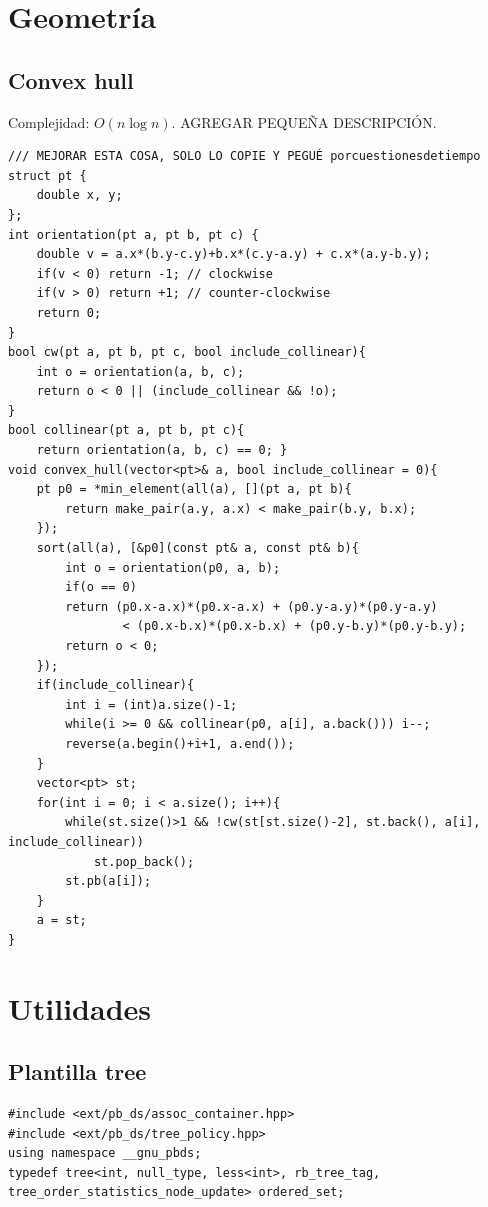 \documentclass[12 pts,spanish,mexico]{article}
\numberwithin{equation}{section}
\begin{document}
\begin{multicols}{2}
\section{Geometría}
\subsection{Convex hull}
Complejidad: $O(n\log n)$. AGREGAR PEQUEÑA DESCRIPCIÓN.
\begin{verbatim}
/// MEJORAR ESTA COSA, SOLO LO COPIE Y PEGUÉ porcuestionesdetiempo
struct pt {
    double x, y;
};
int orientation(pt a, pt b, pt c) {
    double v = a.x*(b.y-c.y)+b.x*(c.y-a.y) + c.x*(a.y-b.y);
    if(v < 0) return -1; // clockwise
    if(v > 0) return +1; // counter-clockwise
    return 0;
}
bool cw(pt a, pt b, pt c, bool include_collinear){
    int o = orientation(a, b, c);
    return o < 0 || (include_collinear && !o);
}
bool collinear(pt a, pt b, pt c){
    return orientation(a, b, c) == 0; }
void convex_hull(vector<pt>& a, bool include_collinear = 0){
    pt p0 = *min_element(all(a), [](pt a, pt b){
        return make_pair(a.y, a.x) < make_pair(b.y, b.x);
    });
    sort(all(a), [&p0](const pt& a, const pt& b){
        int o = orientation(p0, a, b);
        if(o == 0)
        return (p0.x-a.x)*(p0.x-a.x) + (p0.y-a.y)*(p0.y-a.y)
                < (p0.x-b.x)*(p0.x-b.x) + (p0.y-b.y)*(p0.y-b.y);
        return o < 0;
    });
    if(include_collinear){
        int i = (int)a.size()-1;
        while(i >= 0 && collinear(p0, a[i], a.back())) i--;
        reverse(a.begin()+i+1, a.end());
    }
    vector<pt> st;
    for(int i = 0; i < a.size(); i++){
        while(st.size()>1 && !cw(st[st.size()-2], st.back(), a[i], include_collinear))
            st.pop_back();
        st.pb(a[i]);
    }
    a = st;
}
\end{verbatim}

\section{Utilidades}
\subsection{Plantilla tree}
\begin{verbatim}
#include <ext/pb_ds/assoc_container.hpp>
#include <ext/pb_ds/tree_policy.hpp>
using namespace __gnu_pbds;
typedef tree<int, null_type, less<int>, rb_tree_tag, tree_order_statistics_node_update> ordered_set;
\end{verbatim}


\end{multicols}
\end{document}
